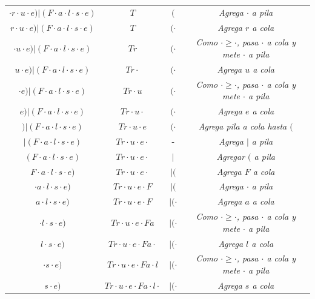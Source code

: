 \documentclass[12pt, letterpaper]{article}
\begin{document}
\begin{enumerate}
\begin{table}[htbp]
\begin{tabular}{cccc}
        $\cdot r \cdot u \cdot e) | (F \cdot a \cdot l \cdot s \cdot e)$ & $T$ & $($ & \textit{Agrega $\cdot$ a pila} \\
        $r \cdot u \cdot e) | (F \cdot a \cdot l \cdot s \cdot e)$ & $T$ & $(\cdot$ & \textit{Agrega $r$ a cola} \\
        $\cdot u \cdot e) | (F \cdot a \cdot l \cdot s \cdot e)$ & $Tr$ & $(\cdot$ & \textit{Como $\cdot \ge \cdot$, pasa $\cdot$ a cola y mete $\cdot$ a pila} \\
        $u \cdot e) | (F \cdot a \cdot l \cdot s \cdot e)$ & $Tr\cdot$ & $(\cdot$ & \textit{Agrega $u$ a cola} \\
        $\cdot e) | (F \cdot a \cdot l \cdot s \cdot e)$ & $Tr\cdot u$ & $(\cdot$ & \textit{Como $\cdot \ge \cdot$, pasa $\cdot$ a cola y mete $\cdot$ a pila} \\
        $e) | (F \cdot a \cdot l \cdot s \cdot e)$ & $Tr\cdot u\cdot$ & $(\cdot$ & \textit{Agrega $e$ a cola} \\
        $) | (F \cdot a \cdot l \cdot s \cdot e)$ & $Tr\cdot u\cdot e$ & $(\cdot$ & \textit{Agrega pila a cola hasta $($} \\
        $| (F \cdot a \cdot l \cdot s \cdot e)$ & $Tr\cdot u\cdot e\cdot$ & - & \textit{Agrega $|$ a pila} \\
        $(F \cdot a \cdot l \cdot s \cdot e)$ & $Tr\cdot u\cdot e\cdot$ & $|$ & \textit{Agregar $($ a pila} \\
        $F \cdot a \cdot l \cdot s \cdot e)$ & $Tr\cdot u\cdot e\cdot$ & $|($ & \textit{Agrega $F$ a cola} \\
        $\cdot a \cdot l \cdot s \cdot e)$ & $Tr\cdot u\cdot e\cdot F$ & $|($ & \textit{Agrega $\cdot$ a pila} \\
        $a \cdot l \cdot s \cdot e)$ & $Tr\cdot u\cdot e\cdot F$ & $|(\cdot$ & \textit{Agrega $a$ a cola} \\
        $\cdot l \cdot s \cdot e)$ & $Tr\cdot u\cdot e\cdot Fa$ & $|(\cdot$ & \textit{Como $\cdot \ge \cdot$, pasa $\cdot$ a cola y mete $\cdot$ a pila} \\
        $l \cdot s \cdot e)$ & $Tr\cdot u\cdot e\cdot Fa\cdot$ & $|(\cdot$ & \textit{Agrega $l$ a cola} \\
        $\cdot s \cdot e)$ & $Tr\cdot u\cdot e\cdot Fa\cdot l$ & $|(\cdot$ & \textit{Como $\cdot \ge \cdot$, pasa $\cdot$ a cola y mete $\cdot$ a pila} \\
        $s \cdot e)$ & $Tr\cdot u\cdot e\cdot Fa\cdot l\cdot$ & $|(\cdot$ & \textit{Agrega $s$ a cola} \\

\end{tabular}
\end{table}
\end{enumerate}
\end{document}
